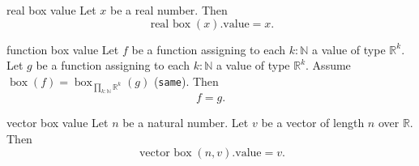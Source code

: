\begin{cleanresult}{real box value}
Let $x$ be a real number.
Then \[\operatorname{real\ box}(x).\mathrm{value} = x.\]
\end{cleanresult}

\begin{cleanresult}{function box value}
Let $f$ be a function assigning to each $k : \mathbb{N}$ a value of type $\mathbb{R}^{k}$.
Let $g$ be a function assigning to each $k : \mathbb{N}$ a value of type $\mathbb{R}^{k}$.
Assume $\operatorname{box}(f) = \operatorname{box}_{\prod_{k:\mathbb{N}} \mathbb{R}^{k}}(g)$ (\texttt{same}).
Then \[f = g.\]
\end{cleanresult}

\begin{cleanresult}{vector box value}
Let $n$ be a natural number.
Let $v$ be a vector of length $n$ over $\mathbb{R}$.
Then \[\operatorname{vector\ box}(n, v).\mathrm{value} = v.\]
\end{cleanresult}

